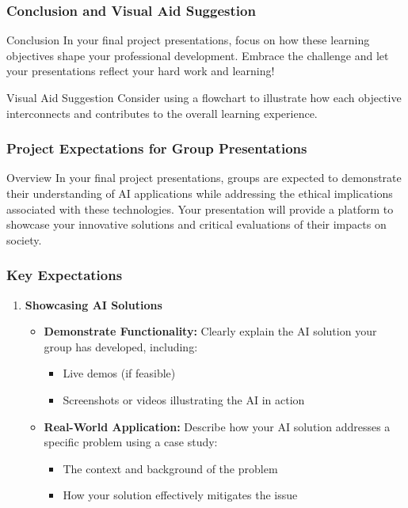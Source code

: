 \documentclass[aspectratio=169]{beamer}
\begin{document}
\begin{frame}[fragile]
    \frametitle{Conclusion and Visual Aid Suggestion}
    \begin{block}{Conclusion}
        In your final project presentations, focus on how these learning objectives shape your professional development. 
        Embrace the challenge and let your presentations reflect your hard work and learning!
    \end{block}
    
    \begin{block}{Visual Aid Suggestion}
        Consider using a flowchart to illustrate how each objective interconnects and contributes to the overall learning experience.
    \end{block}
\end{frame}

\begin{frame}[fragile]
    \frametitle{Project Expectations for Group Presentations}
    \begin{block}{Overview}
        In your final project presentations, groups are expected to demonstrate their understanding of AI applications while addressing the ethical implications associated with these technologies. Your presentation will provide a platform to showcase your innovative solutions and critical evaluations of their impacts on society.
    \end{block}
\end{frame}

\begin{frame}[fragile]
    \frametitle{Key Expectations}

    \begin{enumerate}
        \item \textbf{Showcasing AI Solutions}
            \begin{itemize}
                \item \textbf{Demonstrate Functionality:} Clearly explain the AI solution your group has developed, including:
                    \begin{itemize}
                        \item Live demos (if feasible)
                        \item Screenshots or videos illustrating the AI in action
                    \end{itemize}
                \item \textbf{Real-World Application:} Describe how your AI solution addresses a specific problem using a case study:
                    \begin{itemize}
                        \item The context and background of the problem
                        \item How your solution effectively mitigates the issue
                    \end{itemize}
            \end{itemize}
    \end{enumerate}
\end{frame}
\end{document}
